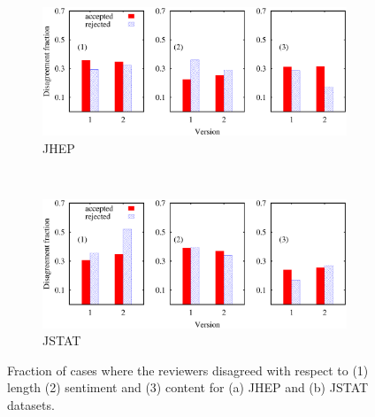 \begin{figure}[!ht]
 \centering
 \begin{subfigure}[b]{0.4\textwidth}
 \centering
  \includegraphics[scale = 0.4]{./texfiles/Chapter_4/cikm_17/figures/jhep_all.eps}
  \caption{\label{disagree:jhep}JHEP}
 \end{subfigure}%
 ~
 \begin{subfigure}[b]{0.4\textwidth}
 \centering
  \includegraphics[scale = 0.28]{./texfiles/Chapter_4/cikm_17/figures/jstat_all.eps}
  \caption{\label{disagree:jstat}JSTAT}
 \end{subfigure}

 \caption{ Fraction of cases where the reviewers disagreed with respect to (1) length (2) sentiment and (3) content for (a) JHEP and (b) JSTAT 
  datasets.}
  
\end{figure}
\fi












